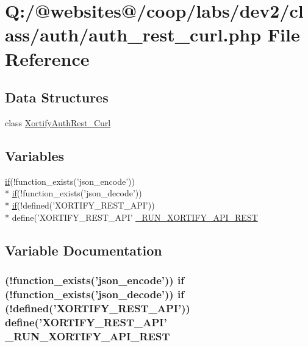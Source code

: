 \hypertarget{auth__rest__curl_8php}{\section{Q\-:/@websites@/coop/labs/dev2/class/auth/auth\-\_\-rest\-\_\-curl.php File Reference}
\label{auth__rest__curl_8php}
}
\subsection*{Data Structures}
\begin{DoxyCompactItemize}
\item 
class \hyperlink{class_xortify_auth_rest___curl}{Xortify\-Auth\-Rest\-\_\-\-Curl}
\end{DoxyCompactItemize}
\subsection*{Variables}
\begin{DoxyCompactItemize}
\item 
\hyperlink{index_8php_ae2ccdf355624402b65fc2226f2a661cd}{if}(!function\-\_\-exists('json\-\_\-encode')) \\*
\hyperlink{index_8php_ae2ccdf355624402b65fc2226f2a661cd}{if}(!function\-\_\-exists('json\-\_\-decode')) \\*
\hyperlink{index_8php_ae2ccdf355624402b65fc2226f2a661cd}{if}(!defined('X\-O\-R\-T\-I\-F\-Y\-\_\-\-R\-E\-S\-T\-\_\-\-A\-P\-I')) \\*
define('X\-O\-R\-T\-I\-F\-Y\-\_\-\-R\-E\-S\-T\-\_\-\-A\-P\-I' \hyperlink{auth__rest__curl_8php_afdc545ca06d322c86eccc65ea3f38868}{\-\_\-\-R\-U\-N\-\_\-\-X\-O\-R\-T\-I\-F\-Y\-\_\-\-A\-P\-I\-\_\-\-R\-E\-S\-T}
\end{DoxyCompactItemize}


\subsection{Variable Documentation}
\hypertarget{auth__rest__curl_8php_afdc545ca06d322c86eccc65ea3f38868}{
\subsubsection[{\-\_\-\-R\-U\-N\-\_\-\-X\-O\-R\-T\-I\-F\-Y\-\_\-\-A\-P\-I\-\_\-\-R\-E\-S\-T}]{ (!function\-\_\-exists('json\-\_\-encode')) {\bf if} (!function\-\_\-exists('json\-\_\-decode')) {\bf if} (!defined('X\-O\-R\-T\-I\-F\-Y\-\_\-\-R\-E\-S\-T\-\_\-\-A\-P\-I')) define('X\-O\-R\-T\-I\-F\-Y\-\_\-\-R\-E\-S\-T\-\_\-\-A\-P\-I' \-\_\-\-R\-U\-N\-\_\-\-X\-O\-R\-T\-I\-F\-Y\-\_\-\-A\-P\-I\-\_\-\-R\-E\-S\-T}}\label{auth__rest__curl_8php_afdc545ca06d322c86eccc65ea3f38868}
